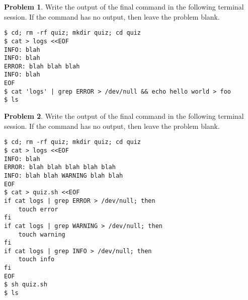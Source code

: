 \documentclass[10pt]{article}
\theoremstyle{definition}
\newtheorem{problem}{Problem}
\begin{document}
\filbreak
\begin{problem}
    Write the output of the final command in the following terminal session.
    If the command has no output, then leave the problem blank.
\end{problem}
\begin{lstlisting}
$ cd; rm -rf quiz; mkdir quiz; cd quiz
$ cat > logs <<EOF
INFO: blah
INFO: blah
ERROR: blah blah blah
INFO: blah
EOF
$ cat 'logs' | grep ERROR > /dev/null && echo hello world > foo
$ ls
\end{lstlisting}

\newpage
\begin{problem}
    Write the output of the final command in the following terminal session.
    If the command has no output, then leave the problem blank.
\end{problem}
\begin{lstlisting}
$ cd; rm -rf quiz; mkdir quiz; cd quiz
$ cat > logs <<EOF
INFO: blah
ERROR: blah blah blah blah blah
INFO: blah blah WARNING blah blah
EOF
$ cat > quiz.sh <<EOF
if cat logs | grep ERROR > /dev/null; then
    touch error
fi
if cat logs | grep WARNING > /dev/null; then
    touch warning
fi
if cat logs | grep INFO > /dev/null; then
    touch info
fi
EOF
$ sh quiz.sh
$ ls
\end{lstlisting}
\end{document}
